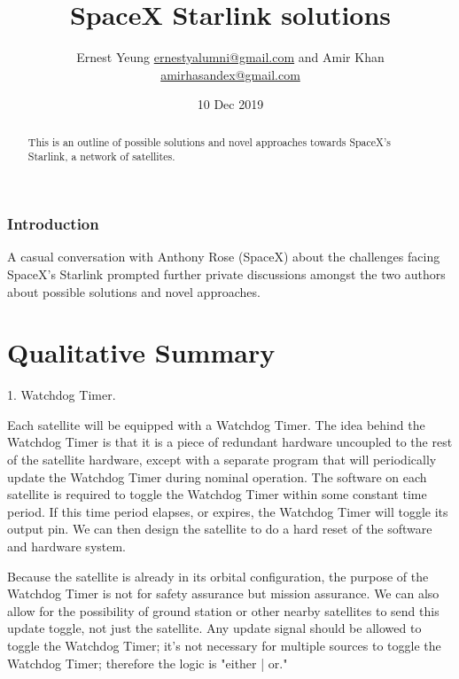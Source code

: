 \documentclass[10pt]{amsart}
\title[SpaceX Starlink solutions]{SpaceX Starlink solutions}
\author{Ernest Yeung \href{mailto:ernestyalumni@gmail.com}{ernestyalumni@gmail.com} and Amir Khan \href{mailto:amirhasandex@gmail.com}{amirhasandex@gmail.com}}
\date{10 Dec 2019}
\begin{document}

\maketitle

\tableofcontents

\begin{abstract}
This is an outline of possible solutions and novel approaches towards SpaceX's Starlink, a network of satellites.
\end{abstract}

\section{Introduction}

A casual conversation with Anthony Rose (SpaceX) about the challenges facing SpaceX's Starlink prompted further private discussions amongst the two authors about possible solutions and novel approaches.

\part{Qualitative Summary}

1. Watchdog Timer.

Each satellite will be equipped with a Watchdog Timer. The idea behind the Watchdog Timer is that it is a piece of redundant hardware uncoupled to the rest of the satellite hardware, except with a separate program that will periodically update the Watchdog Timer during nominal operation. The software on each satellite is required to toggle the Watchdog Timer within some constant time period. If this time period elapses, or expires, the Watchdog Timer will toggle its output pin. We can then design the satellite to do a hard reset of the software and hardware system.

Because the satellite is already in its orbital configuration, the purpose of the Watchdog Timer is not for safety assurance but mission assurance. We can also allow for the possibility of ground station or other nearby satellites to send this update toggle, not just the satellite. Any update signal should be allowed to toggle the Watchdog Timer; it's not necessary for multiple sources to toggle the Watchdog Timer; therefore the logic is "either | or." 
\end{document}
